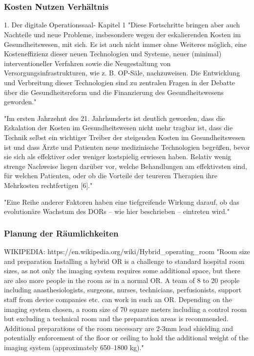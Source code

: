 \chapter{}
\label{sec:overview}

\subsection{Kosten Nutzen Verhältnis}
1. Der digitale Operationssaal- Kapitel 1
	"Diese Fortschritte bringen aber auch Nachteile und neue Probleme, insbesondere
	wegen der eskalierenden Kosten im Gesundheitswesen, mit sich. Es ist auch nicht
	immer ohne Weiteres möglich, eine Kosteneffizienz dieser neuen Technologien und
	Systeme, neuer (minimal) interventioneller Verfahren sowie die Neugestaltung von
	Versorgungsinfrastrukturen, wie z. B. OP-Säle, nachzuweisen. Die Entwicklung und
	Verbreitung dieser Technologien sind zu zentralen Fragen in der Debatte über die
	Gesundheitsreform und die Finanzierung des Gesundheitswesens geworden."
	
	"Im ersten Jahrzehnt des 21. Jahrhunderts ist deutlich geworden, dass die Eskalation
	der Kosten im Gesundheitswesen nicht mehr tragbar ist, dass die Technik selbst
	ein wichtiger Treiber der steigenden Kosten im Gesundheitswesen ist und dass Ärzte
	und Patienten neue medizinische Technologien begrüßen, bevor sie sich als effektiver
	oder weniger kostspielig erwiesen haben. Relativ wenig strenge Nachweise liegen
	darüber vor, welche Behandlungen am effektivsten sind, für welchen Patienten, oder
	ob die Vorteile der teureren Therapien ihre Mehrkosten rechtfertigen [6]."
	
	"Eine Reihe anderer Faktoren haben eine tiefgreifende Wirkung
	darauf, ob das evolutionäre Wachstum des DORs – wie hier beschrieben – eintreten
	wird."


\subsection{Planung der Räumlichkeiten}
WIKIPEDIA: https://en.wikipedia.org/wiki/Hybrid_operating_room
	"Room size and preparation
	Installing a hybrid OR is a challenge to standard hospital room sizes, as not only the imaging system requires some additional space, but there are also more people in the room as in a normal OR. A team of 8 to 20 people including anasthesiologists, surgeons, nurses, technicians, perfusionists, support staff from device companies etc. can work in such an OR. Depending on the imaging system chosen, a room size of 70 square meters including a control room but excluding a technical room and the preparation areas is recommended. Additional preparations of the room necessary are 2-3mm lead shielding and potentially enforcement of the floor or ceiling to hold the additional weight of the imaging system (approximately 650–1800 kg)."
	
